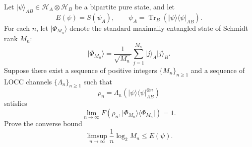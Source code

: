 Let $\lvert \psi\rangle_{AB}\in\mathcal{H}_A\otimes\mathcal{H}_B$ be a bipartite pure state, and let
$$
E(\psi)=S(\psi_A),
\qquad
\psi_A=\operatorname{Tr}_B(\lvert \psi\rangle\!\langle \psi\rvert_{AB}).
$$
For each $n$, let $\lvert \Phi_{M_n}\rangle$ denote the standard maximally entangled state of Schmidt rank
$M_n$:
$$
\lvert \Phi_{M_n}\rangle=\frac{1}{\sqrt{M_n}}\sum_{j=1}^{M_n}\lvert j\rangle_A\lvert j\rangle_B.
$$
Suppose there exist a sequence of positive integers $\{M_n\}_{n\ge1}$ and a sequence of LOCC
channels $\{\Lambda_n\}_{n\ge1}$ such that
$$
\rho_n=\Lambda_n\!\left(\lvert \psi\rangle\!\langle \psi\rvert_{AB}^{\otimes n}\right)
$$
satisfies
$$
\lim_{n\to\infty}F(\rho_n,\lvert \Phi_{M_n}\rangle\!\langle \Phi_{M_n}\rvert)=1.
$$
Prove the converse bound
$$
\limsup_{n\to\infty}\frac1n\log_2M_n\le E(\psi).
$$
